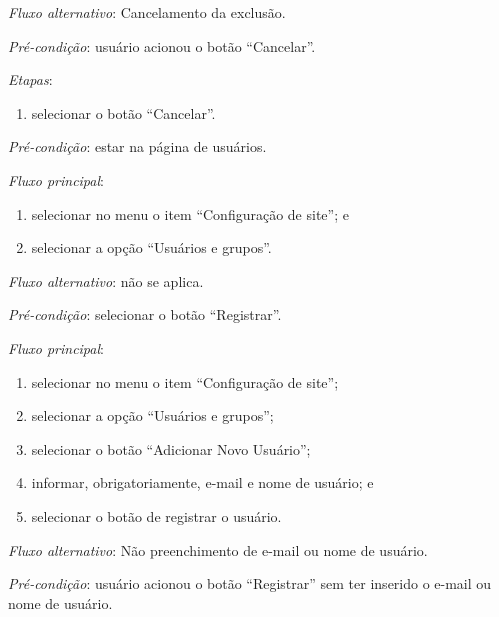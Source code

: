\documentclass[a4paper,12pt]{article}
\begin{document}
\noindent \textit{Fluxo alternativo}: Cancelamento da exclusão.

\noindent \textit{Pré-condição}: usuário acionou o botão ``Cancelar''.

\noindent \textit{Etapas}:

\begin{enumerate}
    \item selecionar o botão ``Cancelar''.
\end{enumerate}


\vspace{0.7cm}

\noindent \textit{Pré-condição}: estar na página de usuários.

\noindent \textit{Fluxo principal}:

\begin{enumerate}
    \item selecionar no menu o item ``Configuração de site''; e
    \item selecionar a opção ``Usuários e grupos''.
\end{enumerate}

\noindent \textit{Fluxo alternativo}: não se aplica.



\vspace{0.7cm}

\noindent \textit{Pré-condição}: selecionar o botão ``Registrar''.

\noindent \textit{Fluxo principal}:

\begin{enumerate}
    \item selecionar no menu o item ``Configuração de site'';
    \item selecionar a opção ``Usuários e grupos'';
    \item selecionar o botão ``Adicionar Novo Usuário'';
    \item informar, obrigatoriamente, e-mail e nome de usuário; e
    \item selecionar o botão de registrar o usuário.
\end{enumerate}

\noindent \textit{Fluxo alternativo}: Não preenchimento de e-mail ou nome de usuário.

\noindent \textit{Pré-condição}: usuário acionou o botão ``Registrar'' sem ter inserido o e-mail ou nome de usuário.
\end{document}
